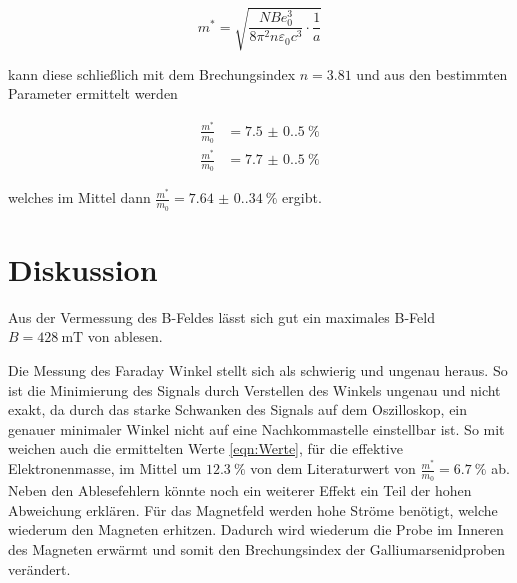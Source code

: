 \begin{equation}
    m^{\ast}=\sqrt{\frac{NBe_0^3}{8 \pi^2 n \varepsilon_0 c^3} \cdot \frac{1}{a}}
\end{equation}

kann diese schließlich mit dem Brechungsindex $n=3.81$ \cite{web:Brechungsindex} und aus den bestimmten Parameter ermittelt werden 

\begin{align}
    \frac{m^{\ast}}{m_0}&=\qty{7.5(0.5)}{\%}\\
    \frac{m^{\ast}}{m_0}&=\qty{7.7(0.5)}{\%}
    \label{eqn:Werte}
\end{align}

welches im Mittel dann $\frac{m^{\ast}}{m_0}=\qty{7.64(0.34)}{\%}$ ergibt.


\section{Diskussion}
Aus der Vermessung des B-Feldes lässt sich gut ein maximales B-Feld $B=\qty{428}{\milli\tesla}$ von ablesen. 

Die Messung des Faraday Winkel stellt sich als schwierig und ungenau heraus. 
So ist die Minimierung des Signals durch Verstellen des Winkels ungenau und nicht exakt, 
da durch das starke Schwanken des Signals auf dem Oszilloskop, ein genauer minimaler Winkel nicht auf eine Nachkommastelle einstellbar ist. 
So mit weichen auch die ermittelten Werte \eqref{eqn:Werte}, für die effektive Elektronenmasse, 
im Mittel um $\qty{12.3}{\%}$ von dem Literaturwert von $\frac{m^{\ast}}{m_0}=\qty{6.7}{\%}$ \cite{web:GaAs} ab.
Neben den Ablesefehlern könnte noch ein weiterer Effekt ein Teil der hohen Abweichung erklären.
Für das Magnetfeld werden hohe Ströme benötigt, welche wiederum den Magneten erhitzen.
Dadurch wird wiederum die Probe im Inneren des Magneten erwärmt und somit den Brechungsindex der Galliumarsenidproben verändert. 


\newpage
\printbibliography

